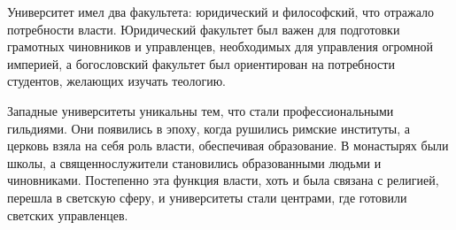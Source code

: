 Университет имел два факультета: юридический и философский, что отражало потребности власти. Юридический факультет был важен для подготовки грамотных чиновников и управленцев, необходимых для управления огромной империей, а богословский факультет был ориентирован на потребности студентов, желающих изучать теологию.


Западные университеты уникальны тем, что стали профессиональными гильдиями. Они появились в эпоху, когда рушились римские институты, а церковь взяла на себя роль власти, обеспечивая образование. В монастырях были школы, а священнослужители становились образованными людьми и чиновниками. Постепенно эта функция власти, хоть и была связана с религией, перешла в светскую сферу, и университеты стали центрами, где готовили светских управленцев.

